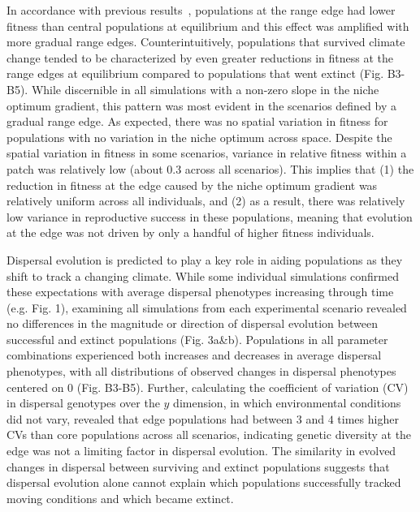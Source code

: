 \documentclass[11pt]{article}
\begin{document}
In accordance with previous results~\citep{garcia1997genetic}, populations at the range edge had lower fitness than central populations at equilibrium and this effect was amplified with more gradual range edges. Counterintuitively, populations that survived climate change tended to be characterized by even greater reductions in fitness at the range edges at equilibrium compared to populations that went extinct (Fig. B3-B5). While discernible in all simulations with a non-zero slope in the niche optimum gradient, this pattern was most evident in the scenarios defined by a gradual range edge. As expected, there was no spatial variation in fitness for populations with no variation in the niche optimum across space. Despite the spatial variation in fitness in some scenarios, variance in relative fitness within a patch was relatively low (about $0.3$ across all scenarios). This implies that (1) the reduction in fitness at the edge caused by the niche optimum gradient was relatively uniform across all individuals, and (2) as a result, there was relatively low variance in reproductive success in these populations, meaning that evolution at the edge was not driven by only a handful of higher fitness individuals.

Dispersal evolution is predicted to play a key role in aiding populations as they shift to track a changing climate. While some individual simulations confirmed these expectations with average dispersal phenotypes increasing through time (e.g. Fig. 1), examining all simulations from each experimental scenario revealed no differences in the magnitude or direction of dispersal evolution between successful and extinct populations (Fig. 3a\&b). Populations in all parameter combinations experienced both increases and decreases in average dispersal phenotypes, with all distributions of observed changes in dispersal phenotypes centered on $0$ (Fig. B3-B5). Further, calculating the coefficient of variation (CV) in dispersal genotypes over the $y$ dimension, in which environmental conditions did not vary, revealed that edge populations had between $3$ and $4$ times higher CVs than core populations across all scenarios, indicating genetic diversity at the edge was not a limiting factor in dispersal evolution. The similarity in evolved changes in dispersal between surviving and extinct populations suggests that dispersal evolution alone cannot explain which populations successfully tracked moving conditions and which became extinct.
\end{document}
